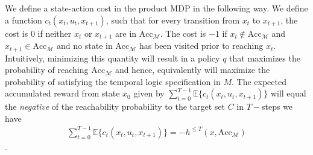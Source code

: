We define a state-action cost in the product MDP in the following way. We define a function $c_t(x_t,u_t,x_{t+1})$, such that for every transition from $x_t$ to $x_{t+1}$, the cost is $0$ if neither $x_t$ or $x_{t+1}$ are in $\textrm{Acc}_{\mathcal{M}}$. The cost is $-1$ if $x_t \notin \textrm{Acc}_{\mathcal{M}}$ and $x_{t+1} \in \textrm{Acc}_{\mathcal{M}}$ and no state in $\textrm{Acc}_{\mathcal{M}}$ has been visited prior to reaching $x_t$.  Intuitively, minimizing this quantity will result in a policy $q$ that maximizes the probability of reaching $\textrm{Acc}_{\mathcal{M}}$ and hence, equivalently will maximize the probability of satisfying the temporal logic specification in $M$. The expected accumulated reward from state $x_0$ given by $\sum_{t=0}^{T-1}\mathbb{E}\{c_t(x_t,u_t,x_{t+1})\}$ will equal the \emph{negative} of the reachability probability to the target set $C$ in $T-$steps \ie we have
\vspace{-0.2cm}
\begin{align}\label{eqn:cost}
\sum_{t=0}^{T-1}\mathbb{E}\{c_t(x_t,u_t,x_{t+1})\} = -h^{\leq T}(x,\textrm{Acc}_{\mathcal{M}})
\end{align}.
\vspace{-0.3cm}




